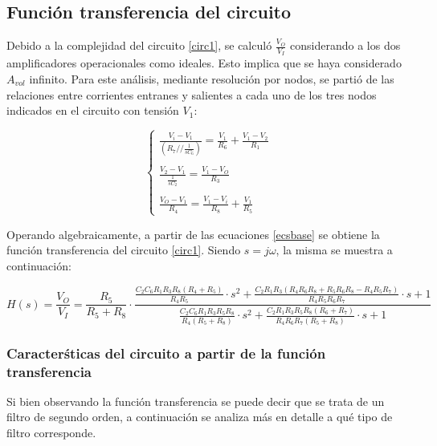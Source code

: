 \subsection{Funci\'on transferencia del circuito}
Debido a la complejidad del circuito \ref{circ1}, se  calcul\'o $\frac{V_O}{V_I}$ considerando a los dos amplificadores operacionales como ideales. Esto implica que se haya considerado $A_{vol}$ infinito. Para este an\'alisis, mediante resoluci\'on por nodos, se parti\'o de las relaciones entre corrientes entranes y salientes a cada uno de los tres nodos indicados en el circuito con tensi\'on $V_1$:

\begin{equation}
	\begin{cases}
		\frac{V_i - V_1}{(R_7 // \frac{1}{sC_6})} = \frac{V_1}{R_6} + \frac{V_1 - V_2}{R_1}\\ \\
		\frac{V_2 - V_1}{\frac{1}{sC_2}} = \frac{V_1 - V_O}{R_3}\\ \\
		\frac{V_O - V_1}{R_4} = \frac{V_1 - V_i}{R_8} + \frac{V_1}{R_5}
	\end{cases}
	\label{ecsbase}
\end{equation}

Operando algebraicamente, a partir de las ecuaciones \ref{ecsbase} se obtiene la funci\'on transferencia del circuito \ref{circ1}. Siendo $s = j\omega$, la misma se muestra a continuaci\'on:

\begin{equation}
 	H(s) = \frac{V_O}{V_I} = \frac{R_5}{R_5 + R_8} \cdot 
 	\frac
 	{\frac{C_2 C_6 R_1 R_3 R_8 (R_4 + R_5)}{R_4 R_5} \cdot s^2
 		+\frac{C_2 R_1 R_3 (R_4 R_6 R_8 + R_5 R_6 R_8 - R_4 R_5 R_7)}{R_4 R_5 R_6 R_7} \cdot s
 		+1}
 	{\frac{C_2 C_6 R_1 R_3 R_5 R_8}{R_4 (R_5 + R_8)} \cdot s^2
 		+\frac{C_2 R_1 R_3 R_5 R_8 (R_6 + R_7)}{R_4 R_6 R_7 (R_5 + R_8)} \cdot s
 		+1
 	}
	\label{vovi}
\end{equation}


\subsubsection{Caracter\'sticas del circuito a partir de la funci\'on transferencia}

Si bien observando la funci\'on transferencia se puede decir que se trata de un filtro de segundo orden, a continuaci\'on se analiza m\'as en detalle a qu\'e tipo de filtro corresponde.

